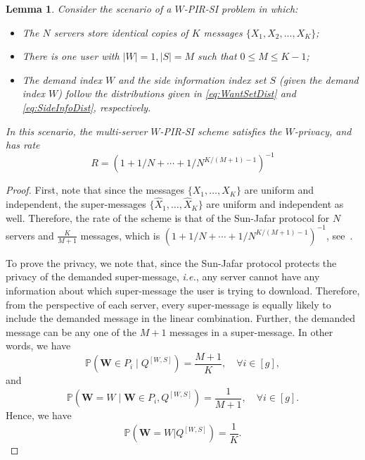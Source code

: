 \documentclass[letterpaper, 10 pt, conference]{ieeeconf}
\newtheorem{lemma}{Lemma}
\newcommand{\ie}{{\it i.e.}}
\newcommand{\Q}[2]{Q^{[#1, #2]}} %
\begin{document}
\begin{lemma}
\label{lem:WPIRAch-NonDivis}
Consider the scenario of a $W$-PIR-SI problem in which:
\begin{itemize}
\item The $N$ servers store identical copies of $K$ messages $\{X_1,X_2,...,X_K\}$;
\item There is one user with $|W|=1,|S|=M$ such that $0\leq M\leq K-1$;
\item The demand index $W$ and the side information index set $S$ (given the demand index $W$) follow the distributions given in \eqref{eq:WantSetDist} and \eqref{eq:SideInfoDist}, respectively.
\end{itemize}
In this scenario, the multi-server $W$-PIR-SI scheme satisfies the $W$-privacy, and has rate $$R = \left(1 + 1/N + \cdots + 1/N^{K/(M+1)-1}\right)^{-1}$$
\end{lemma}
\begin{proof}%
First, note that since the messages $\{X_1,\dots,X_K\}$ are uniform and independent, the super-messages $\{\hat{X}_1,\dots,\hat{X}_K\}$ are uniform and independent as well. Therefore, the rate of the scheme is that of the Sun-Jafar protocol for $N$ servers and $\frac{K}{M+1}$ messages,  which is $\left(1 + 1/N + \cdots + 1/N^{K/(M+1)-1}\right)^{-1}$, see~\cite[Theorem 1]{sun2016capacitynoncol}. 

To prove the privacy, we note that, since the Sun-Jafar protocol protects the  privacy of the demanded super-message, \ie, any server cannot have any information about which super-message the user is trying to download. Therefore, from the perspective of each server, every super-message is  equally likely to include the demanded message in the linear combination. Further, the demanded message can be any one of the $M+1$ messages in a super-message. In other words, we have
$$\mathbb{P}(\mathbf{W}\in P_i \mid \Q{W}{S}) = \frac{M+1}{K}, \quad \forall i\in[g],$$
and\\ 
$$ \mathbb{P}(\mathbf{W} = W \mid \mathbf{W}\in P_i,\Q{W}{S}) = \frac{1}{M+1},\quad\forall i\in[g].$$
Hence, we have
$$\mathbb{P}(\mathbf{W} = W|Q^{[W,S]})  = \frac{1}{K}.$$
\end{proof}
\end{document}
